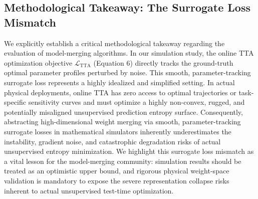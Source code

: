 \subsection{Methodological Takeaway: The Surrogate Loss Mismatch}
\label{subsec:methodological_takeaway}
We explicitly establish a critical methodological takeaway regarding the evaluation of model-merging algorithms.
In our simulation study, the online TTA optimization objective $\mathcal{L}_{\text{TTA}}$ (Equation 6) directly tracks the ground-truth optimal parameter profiles perturbed by noise.
This smooth, parameter-tracking surrogate loss represents a highly idealized and simplified setting.
In actual physical deployments, online TTA has zero access to optimal trajectories or task-specific sensitivity curves and must optimize a highly non-convex, rugged, and potentially misaligned unsupervised prediction entropy surface.
Consequently, abstracting high-dimensional weight merging via smooth, parameter-tracking surrogate losses in mathematical simulators inherently underestimates the instability, gradient noise, and catastrophic degradation risks of actual unsupervised entropy minimization.
We highlight this surrogate loss mismatch as a vital lesson for the model-merging community: simulation results should be treated as an optimistic upper bound, and rigorous physical weight-space validation is mandatory to expose the severe representation collapse risks inherent to actual unsupervised test-time optimization.

